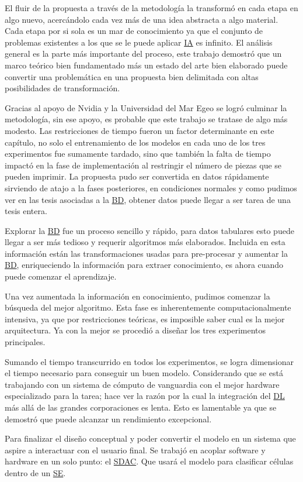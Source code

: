 El fluir de la propuesta a través de la metodología la transformó en cada etapa
en algo nuevo, acercándolo cada vez más de una idea abstracta a algo material.
Cada etapa por si sola es un mar de conocimiento ya que el conjunto de problemas
existentes a los que se le puede aplicar \hyperlink{abbr}{IA} es infinito. El
análisis general es la parte más importante del proceso, este trabajo demostró
que un marco teórico bien fundamentado más un estado del arte bien elaborado
puede convertir una problemática en una propuesta bien delimitada con altas
posibilidades de transformación.

Gracias al apoyo de Nvidia y la Universidad del Mar Egeo se logró culminar la
metodología, sin ese apoyo, es probable que este trabajo se tratase de algo más
modesto. Las restricciones de tiempo fueron un factor determinante en este
capítulo, no solo el entrenamiento de los modelos en cada uno de los tres
experimentos fue sumamente tardado, sino que también la falta de tiempo impactó
en la fase de implementación al restringir el número de piezas que se pueden
imprimir. La propuesta pudo ser convertida en datos rápidamente sirviendo de
atajo a la fases posteriores, en condiciones normales y como pudimos ver en las
tesis asociadas a la \hyperlink{abbr}{BD}, obtener datos puede llegar a ser
tarea de una tesis entera.

Explorar la \hyperlink{abbr}{BD} fue un proceso sencillo y rápido, para datos
tabulares esto puede llegar a ser más tedioso y requerir algoritmos más
elaborados. Incluida en esta información están las transformaciones usadas
para pre-procesar y aumentar la \hyperlink{abbr}{BD}, enriqueciendo la información
para extraer conocimiento, es ahora cuando puede comenzar el aprendizaje.

Una vez aumentada la información en conocimiento, pudimos comenzar la búsqueda
del mejor algoritmo. Esta fase es inherentemente computacionalmente intensiva,
ya que por restricciones teóricas, es imposible saber cual es la mejor
arquitectura. Ya con la mejor se procedió a diseñar los tres experimentos
principales.

Sumando el tiempo transcurrido en todos los experimentos, se logra dimensionar
el tiempo necesario para conseguir un buen modelo. Considerando que se está
trabajando con un sistema de cómputo de vanguardia con el mejor hardware
especializado para la tarea; hace ver la razón por la cual la integración del
\hyperlink{abbr}{DL} más allá de las grandes corporaciones es lenta. Esto es
lamentable ya que se demostró que puede alcanzar un rendimiento excepcional.

Para finalizar el diseño conceptual y poder convertir el modelo en un sistema
que aspire a interactuar con el usuario final. Se trabajó en acoplar software y
hardware en un solo punto: el \hyperlink{abbr}{SDAC}. Que usará el modelo para
clasificar células dentro de un \hyperlink{abbr}{SE}.